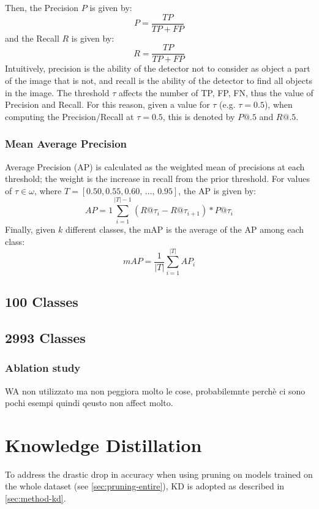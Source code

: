 Then, the Precision $P$ is given by:
\begin{equation} %
    P = \frac{TP}{TP + FP}
\end{equation}
and the Recall $R$ is given by:
\begin{equation} %
    R = \frac{TP}{TP + FP}
\end{equation}
Intuitively, precision is the ability of the detector not to consider as object a part of the image that is not, and recall is the ability of the detector to find all objects in the image.
The threshold $\tau$ affects the number of TP, FP, FN, thus the value of Precision and Recall. For this reason, given a value for $\tau$ (e.g. $\tau = 0.5$), when computing the Precision/Recall at $\tau = 0.5$, this is denoted by $P@.5$ and $R@.5$.

\subsubsection{Mean Average Precision}
Average Precision (AP) is calculated as the weighted mean of precisions at each threshold; the weight is the increase in recall from the prior threshold. For values of $\tau \in \omega$, where $T = [0.50, 0.55, 0.60,\, ..., \, 0.95 ]$, the AP is given by:
\begin{equation}
    AP = 1 \sum_{i=1}^{|T| - 1}(R@\tau_i - R@\tau_{i+1} ) * P@\tau_{i}
\end{equation}
Finally, given $k$ different classes, the mAP is the average of the AP among each class:
\begin{equation}
    mAP = \frac{1}{|T|} \sum_{i=1}^{|T|} AP_i
\end{equation}

\subsection{100 Classes}
\subsection{2993 Classes}
\subsubsection{Ablation study}
WA non utilizzato ma non peggiora molto le cose, probabilemnte perchè ci sono pochi esempi quindi qeusto non affect molto.

\section{Knowledge Distillation}
\label{sec:exp-kd}
To address the drastic drop in accuracy when using pruning on models trained on the whole dataset (see \autoref{sec:pruning-entire}), KD is adopted as described in \autoref{sec:method-kd}.

